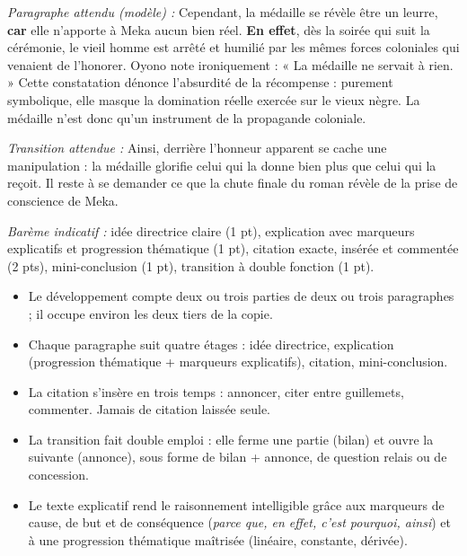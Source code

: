 \documentclass[11pt]{article}
\begin{document}
\begin{corrige}
\emph{Paragraphe attendu (modèle) :} Cependant, la médaille se révèle être un leurre, \textbf{car} elle n'apporte à Meka aucun bien réel. \textbf{En effet}, dès la soirée qui suit la cérémonie, le vieil homme est arrêté et humilié par les mêmes forces coloniales qui venaient de l'honorer. Oyono note ironiquement : « La médaille ne servait à rien. » Cette constatation dénonce l'absurdité de la récompense : purement symbolique, elle masque la domination réelle exercée sur le vieux nègre. La médaille n'est donc qu'un instrument de la propagande coloniale.

\emph{Transition attendue :} Ainsi, derrière l'honneur apparent se cache une manipulation : la médaille glorifie celui qui la donne bien plus que celui qui la reçoit. Il reste à se demander ce que la chute finale du roman révèle de la prise de conscience de Meka.

\emph{Barème indicatif :} idée directrice claire (1 pt), explication avec marqueurs explicatifs et progression thématique (1 pt), citation exacte, insérée et commentée (2 pts), mini-conclusion (1 pt), transition à double fonction (1 pt).
\end{corrige}

\begin{aretenir}
\begin{itemize}
\item Le développement compte deux ou trois parties de deux ou trois paragraphes ; il occupe environ les deux tiers de la copie.
\item Chaque paragraphe suit quatre étages : idée directrice, explication (progression thématique + marqueurs explicatifs), citation, mini-conclusion.
\item La citation s'insère en trois temps : annoncer, citer entre guillemets, commenter. Jamais de citation laissée seule.
\item La transition fait double emploi : elle ferme une partie (bilan) et ouvre la suivante (annonce), sous forme de bilan + annonce, de question relais ou de concession.
\item Le texte explicatif rend le raisonnement intelligible grâce aux marqueurs de cause, de but et de conséquence (\emph{parce que, en effet, c'est pourquoi, ainsi}) et à une progression thématique maîtrisée (linéaire, constante, dérivée).
\end{itemize}
\end{aretenir}
\end{document}
